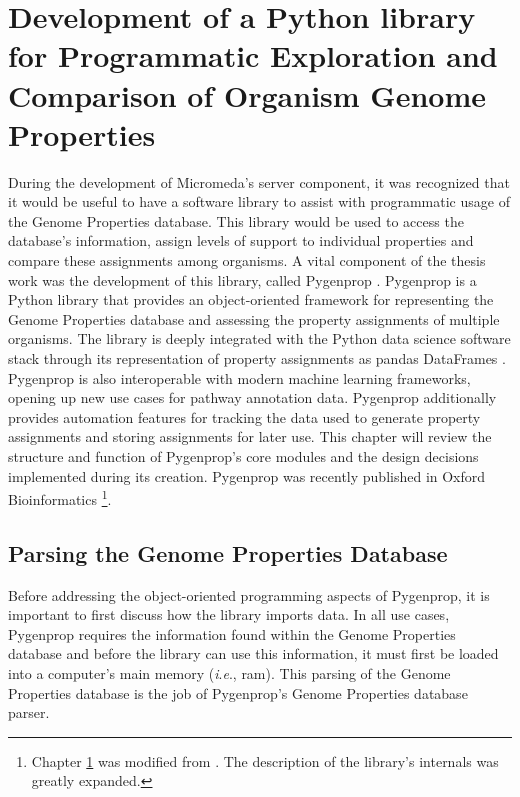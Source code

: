 \chapter{Development of a Python library for Programmatic Exploration and 
Comparison of Organism Genome Properties} \label{Pygenprop}

During the development of Micromeda's server component, it was recognized that 
it would be useful to have a software library to assist with programmatic usage 
of the Genome Properties database. This library would be used to access the 
database's information, assign levels of support to individual properties and 
compare these assignments among organisms. A vital component of the thesis work 
was the development of this library, called Pygenprop 
\cite{bergstrand2019pygenprop}. Pygenprop is a Python library that provides an 
object-oriented framework \cite{booch1986object} for representing the Genome 
Properties database and assessing the property assignments of multiple 
organisms. The library is deeply integrated with the Python data science 
software stack \cite{scipystack} through its representation of property 
assignments as pandas DataFrames \cite{mckinney2010data}. Pygenprop is also 
interoperable with modern machine learning frameworks, opening up new use cases 
for pathway annotation data. Pygenprop additionally provides automation features 
for tracking the data used to generate property assignments and storing 
assignments for later use. This chapter will review the structure and function 
of Pygenprop's core modules and the design decisions implemented during its 
creation. Pygenprop was recently published in Oxford Bioinformatics 
\cite{bergstrand2019pygenprop}\footnote{Chapter \ref{Pygenprop} was modified 
from \cite{bergstrand2019pygenprop}. The description of the library's internals was 
greatly expanded.}.

\section{Parsing the Genome Properties Database} 
\label{genome-properties-parser}

Before addressing the object-oriented programming aspects of Pygenprop, it is 
important to first discuss how the library imports data. In all use cases, 
Pygenprop requires the information found within the Genome Properties database 
and before the library can use this information, it must first be loaded into a 
computer's main memory (\textit{i}.\textit{e}., \gls{ram}). This parsing of the 
Genome Properties database is the job of Pygenprop's Genome Properties database 
parser.

